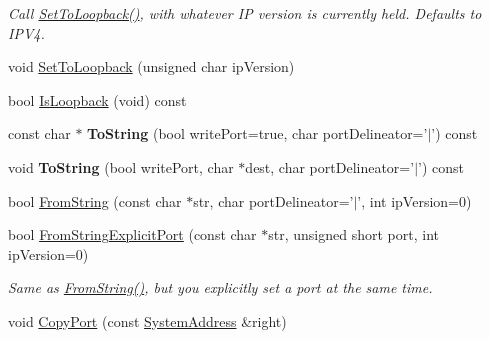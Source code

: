 \begin{DoxyCompactItemize}
\begin{DoxyCompactList}\small\item\em Call \hyperlink{struct_rak_net_1_1_system_address_a53d3920059f3790320d360ccf2a61d14}{Set\-To\-Loopback()}, with whatever I\-P version is currently held. Defaults to I\-P\-V4. \end{DoxyCompactList}\item 
void \hyperlink{struct_rak_net_1_1_system_address_a4afe777a3fed63583f5b3addb6f4d50d}{Set\-To\-Loopback} (unsigned char ip\-Version)
\item 
bool \hyperlink{struct_rak_net_1_1_system_address_a5be63790082254493fa50429d87a95f9}{Is\-Loopback} (void) const 
\item 
\hypertarget{struct_rak_net_1_1_system_address_a35fbe6f44df101a98db498fee93dfa65}{const char $\ast$ {\bfseries To\-String} (bool write\-Port=true, char port\-Delineator='$\vert$') const }\label{struct_rak_net_1_1_system_address_a35fbe6f44df101a98db498fee93dfa65}

\item 
\hypertarget{struct_rak_net_1_1_system_address_ae811e72883e7fa11402f62a3b586edf5}{void {\bfseries To\-String} (bool write\-Port, char $\ast$dest, char port\-Delineator='$\vert$') const }\label{struct_rak_net_1_1_system_address_ae811e72883e7fa11402f62a3b586edf5}

\item 
bool \hyperlink{struct_rak_net_1_1_system_address_ae1ad8bd3b4f24478980437476391d6ab}{From\-String} (const char $\ast$str, char port\-Delineator='$\vert$', int ip\-Version=0)
\item 
\hypertarget{struct_rak_net_1_1_system_address_a4ab0e4c91b94c7a4173bc2fdd286ccf8}{bool \hyperlink{struct_rak_net_1_1_system_address_a4ab0e4c91b94c7a4173bc2fdd286ccf8}{From\-String\-Explicit\-Port} (const char $\ast$str, unsigned short port, int ip\-Version=0)}\label{struct_rak_net_1_1_system_address_a4ab0e4c91b94c7a4173bc2fdd286ccf8}

\begin{DoxyCompactList}\small\item\em Same as \hyperlink{struct_rak_net_1_1_system_address_ae1ad8bd3b4f24478980437476391d6ab}{From\-String()}, but you explicitly set a port at the same time. \end{DoxyCompactList}\item 
\hypertarget{struct_rak_net_1_1_system_address_ac79e3d9d09218269be0810f0092099bd}{void \hyperlink{struct_rak_net_1_1_system_address_ac79e3d9d09218269be0810f0092099bd}{Copy\-Port} (const \hyperlink{struct_rak_net_1_1_system_address}{System\-Address} \&right)}\label{struct_rak_net_1_1_system_address_ac79e3d9d09218269be0810f0092099bd}


\end{DoxyCompactItemize}
